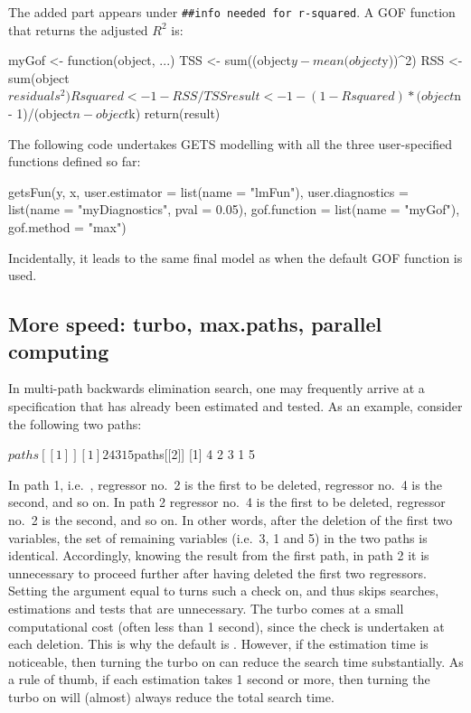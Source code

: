 %
The added part appears under \verb|##info needed for r-squared|. A GOF function that returns the adjusted $R^2$ is:
%
\begin{example}
  myGof <- function(object, ...){
    TSS <- sum((object$y - mean(object$y))^2)
    RSS <- sum(object$residuals^2)
    Rsquared <- 1 - RSS/TSS
    result <- 1 - (1 - Rsquared) * (object$n - 1)/(object$n - object$k)
    return(result)
  }
\end{example}
%
The following code undertakes GETS modelling with all the three user-specified functions defined so far:
%
\begin{example}
  getsFun(y, x, user.estimator = list(name = "lmFun"),
    user.diagnostics = list(name = "myDiagnostics", pval = 0.05),
    gof.function = list(name = "myGof"), gof.method = "max")
\end{example}
%
Incidentally, it leads to the same final model as when the default GOF function is used.

\subsection{More speed: turbo, max.paths, parallel computing}

In multi-path backwards elimination search, one may frequently arrive at a specification that has already been estimated and tested. As an example, consider the following two paths:
%
\begin{example}
  $paths[[1]]
  [1]  2 4 3 1 5

  $paths[[2]]
  [1]  4 2 3 1 5
\end{example}
%
In path 1, i.e.\ , regressor no.\ 2 is the first to be deleted, regressor no.\ 4 is the second, and so on. In path 2 regressor no.\ 4 is the first to be deleted, regressor no.\ 2 is the second, and so on. In other words, after the deletion of the first two variables, the set of remaining variables (i.e.\ 3, 1 and 5) in the two paths is identical. Accordingly, knowing the result from the first path, in path 2 it is unnecessary to proceed further after having deleted the first two regressors. Setting the argument  equal to  turns such a check on, and thus skips searches, estimations and tests that are unnecessary. The turbo comes at a small computational cost (often less than 1 second), since the check is undertaken at each deletion. This is why the default is . However, if the estimation time is noticeable, then turning the turbo on can reduce the search time substantially. As a rule of thumb, if each estimation takes 1 second or more, then turning the turbo on will (almost) always reduce the total search time.

